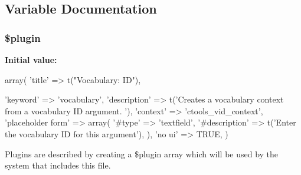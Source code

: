 \subsection{Variable Documentation}
\hypertarget{vid_8inc_ada8a7130088351710bb02ed622d6bf65}{
\subsubsection[{\$plugin}]{\setlength{\rightskip}{0pt plus 5cm}\$plugin}}
\label{vid_8inc_ada8a7130088351710bb02ed622d6bf65}
{\bfseries Initial value:}
\begin{DoxyCode}
 array(
  'title' => t("Vocabulary: ID"),
  
  'keyword' => 'vocabulary',
  'description' => t('Creates a vocabulary context from a vocabulary ID argument.
      '),
  'context' => 'ctools_vid_context',
  'placeholder form' => array(
    '#type' => 'textfield',
    '#description' => t('Enter the vocabulary ID for this argument'),
  ),
  'no ui' => TRUE,
)
\end{DoxyCode}
Plugins are described by creating a \$plugin array which will be used by the system that includes this file. 